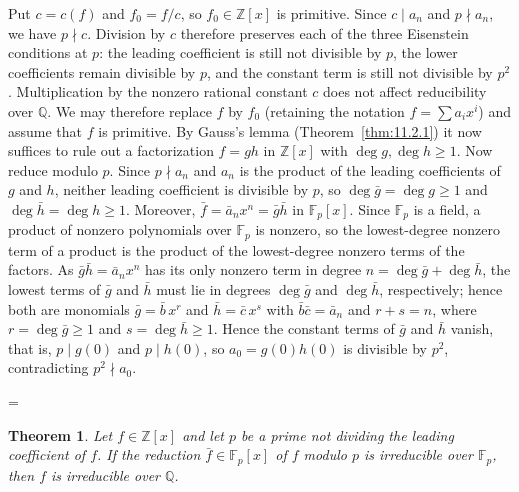 \documentclass[11pt]{article}
\makeatletter
\theoremstyle{ntstyle}
\newtheorem{theorem}{Theorem}[subsection]
\let\nt@closedisplay\]
\def\nt@guardedclose{\@ifnextchar\par{\nt@closeafterpar}{\@ifnextchar\end{\postdisplaypenalty\@M\nt@closedisplay}{\nt@closedisplay}}}
\def\nt@closeafterpar\par{\@ifnextchar\par{\nt@closeafterpar}{\@ifnextchar\end{\postdisplaypenalty\@M\nt@closedisplay\par}{\nt@closedisplay\par}}}
\renewenvironment{proof}[1][\proofname]{\par
  \pushQED{\qed}\normalfont\topsep\medskipamount\edef\nt@afterproof{\@endparpenalty=\the\@endparpenalty\relax}\@beginparpenalty\@M\@endparpenalty\@M\let\]\nt@guardedclose\trivlist\item[]\textit{#1\@addpunct{.}} \ignorespaces}{\ifvmode\addpenalty\@M\fi\popQED\nt@afterproof\endtrivlist\@endpefalse}
\makeatother
\begin{document}
\begin{proof} Put $c=c(f)$ and $f_0=f/c$, so $f_0\in\mathbb{Z}[x]$ is
	primitive. Since $c\mid a_n$ and $p\nmid a_n$, we have $p\nmid c$.
	Division by $c$ therefore preserves each of the three Eisenstein
	conditions at $p$: the leading coefficient is still not divisible by $p$,
	the lower coefficients remain divisible by $p$, and the constant term
	is still not divisible by $p^2$. Multiplication by the nonzero rational
	constant $c$ does not affect reducibility over $\mathbb{Q}$. We may
	therefore replace $f$ by $f_0$ (retaining the notation $f=\sum a_i x^i$)
	and assume that $f$ is primitive. By Gauss's lemma
	(Theorem~\ref{thm:11.2.1}) it now suffices to rule out a factorization $f=gh$ in
	$\mathbb{Z}[x]$ with $\deg g,\deg h\ge1$. Now reduce modulo $p$. Since $p\nmid a_n$ and $a_n$ is the product of
	the leading coefficients of $g$ and $h$, neither leading
	coefficient is divisible by $p$, so $\deg\bar g=\deg g\ge1$ and
	$\deg\bar h=\deg h\ge1$. Moreover, $\bar f = \bar a_n x^n = \bar g\bar h$
	in $\mathbb{F}_p[x]$. Since $\mathbb{F}_p$ is a field, a product of nonzero polynomials over $\mathbb{F}_p$ is nonzero, so the lowest-degree nonzero term of a product is the product of the lowest-degree nonzero terms of the factors. As $\bar g\bar h=\bar a_n x^n$ has its only nonzero term in degree $n=\deg\bar g+\deg\bar h$, the lowest terms of $\bar g$ and $\bar h$ must lie in degrees $\deg\bar g$ and $\deg\bar h$, respectively; hence both are monomials $\bar g = \bar b\,x^{r}$ and $\bar h = \bar c\,x^{s}$ with $\bar b\bar c=\bar a_n$
	and $r+s=n$, where $r=\deg\bar g\ge1$ and $s=\deg\bar h\ge1$.
	Hence the constant terms of $\bar g$ and $\bar h$ vanish, that is, $p\mid
		g(0)$ and $p\mid h(0)$, so $a_0 = g(0)h(0)$ is divisible by $p^2$,
	contradicting $p^2\nmid a_0$.

\end{proof}
\begin{theorem}\label{thm:11.3.2} Let $f\in\mathbb{Z}[x]$ and let
	$p$ be a prime not dividing the leading coefficient of $f$. If the
	reduction $\bar f\in\mathbb{F}_p[x]$ of $f$ modulo $p$ is irreducible
	over $\mathbb{F}_p$, then $f$ is irreducible over $\mathbb{Q}$.

\end{theorem}
\end{document}
